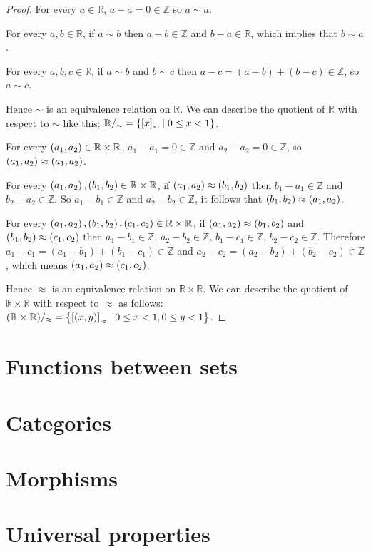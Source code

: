 \begin{proof}
	For every $a\in \mathbb{R}$, $a - a = 0 \in \mathbb{Z}$ so $a\sim a$.

	For every $a, b\in\mathbb{R}$, if $a\sim b$ then $a - b\in \mathbb{Z}$ and $b - a\in \mathbb{R}$, which implies that $b\sim a$.

	For every $a, b, c\in\mathbb{R}$, if $a\sim b$ and $b\sim c$ then $a - c = (a - b) + (b - c) \in \mathbb{Z}$, so $a\sim c$.

	Hence $\sim$ is an equivalence relation on $\mathbb{R}$. We can describe the quotient of $\mathbb{R}$ with respect to $\sim$ like this: $\mathbb{R}/_{\sim} = \left\{{{[x]}_{\sim} \mid 0\leq x < 1}\right\}$.

	\bigskip
	For every $\left({a_{1}, a_{2}}\right) \in \mathbb{R}\times\mathbb{R}$, $a_{1} - a_{1} = 0\in \mathbb{Z}$ and $a_{2} - a_{2} = 0\in \mathbb{Z}$, so $\left({a_{1}, a_{2}}\right) \approx \left({a_{1}, a_{2}}\right)$.

	For every $\left({a_{1}, a_{2}}\right), \left({b_{1}, b_{2}}\right) \in \mathbb{R}\times\mathbb{R}$, if $\left({a_{1}, a_{2}}\right) \approx \left({b_{1}, b_{2}}\right)$ then $b_{1} - a_{1}\in \mathbb{Z}$ and $b_{2} - a_{2}\in \mathbb{Z}$. So $a_{1} - b_{1}\in \mathbb{Z}$ and $a_{2} - b_{2}\in \mathbb{Z}$, it follows that $\left({b_{1}, b_{2}}\right) \approx \left({a_{1}, a_{2}}\right)$.

	For every $\left({a_{1}, a_{2}}\right), \left({b_{1}, b_{2}}\right), \left({c_{1}, c_{2}}\right) \in \mathbb{R}\times\mathbb{R}$, if $\left({a_{1}, a_{2}}\right) \approx \left({b_{1}, b_{2}}\right)$ and $\left({b_{1}, b_{2}}\right) \approx \left({c_{1}, c_{2}}\right)$ then $a_{1} - b_{1} \in \mathbb{Z}$, $a_{2} - b_{2}\in \mathbb{Z}$, $b_{1} - c_{1}\in\mathbb{Z}$, $b_{2} - c_{2}\in \mathbb{Z}$. Therefore $a_{1} - c_{1} = (a_{1} - b_{1}) + (b_{1} - c_{1}) \in \mathbb{Z}$ and $a_{2} - c_{2} = (a_{2} - b_{2}) + (b_{2} - c_{2}) \in \mathbb{Z}$, which means $\left({a_{1}, a_{2}}\right) \approx \left({c_{1}, c_{2}}\right)$.

	Hence $\approx$ is an equivalence relation on $\mathbb{R}\times\mathbb{R}$. We can describe the quotient of $\mathbb{R}\times\mathbb{R}$ with respect to $\approx$ as follows: $(\mathbb{R}\times\mathbb{R})/_{\approx} = \left\{{ {[(x, y)]}_{\approx} \mid 0 \leq x < 1, 0 \leq y < 1 }\right\}$.
\end{proof}

\section{Functions between sets}


\section{Categories}


\section{Morphisms}


\section{Universal properties}


